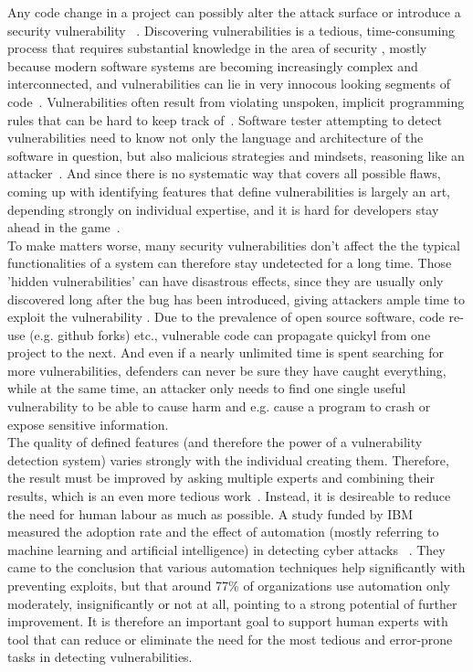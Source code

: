 \documentclass[
	a4paper,
	pagesize,
	pdftex,
	12pt,
	twoside, %
	BCOR=5mm, %
	ngerman,
	fleqn,
	final,
	]{scrartcl}
\begin{document}
Any code change in a project can possibly alter the attack surface or introduce a security vulnerability ~\cite{Morrison.2015}. Discovering vulnerabilities is a tedious, time-consuming process that requires substantial knowledge in the area of security \cite{Yamaguchi.2011}, mostly because modern software systems are becoming increasingly complex and interconnected, and vulnerabilities can lie in very innocous looking segments of code~\cite{Pang.2015, Li.2018}. Vulnerabilities often result from violating unspoken, implicit programming rules that can be hard to keep track of~\cite{Li.2005}. Software tester attempting to detect vulnerabilities need to know not only the language and architecture of the software in question, but also malicious strategies and mindsets, reasoning like an attacker~\cite{Pang.2015}. And since there is no systematic way that covers all possible flaws, coming up with identifying features that define vulnerabilities is largely an art, depending strongly on individual expertise, and it is hard for developers stay ahead in the game~\cite{Rolim.2018,Li.2018}.\\
To make matters worse, many security vulnerabilities don't affect the the typical functionalities of a system can therefore stay undetected for a long time. Those 'hidden vulnerabilities' can have disastrous effects, since they are usually only discovered long after the bug has been introduced, giving attackers ample time to exploit the vulnerability \cite{Wijayasekara.2012,Ma.2017,Russell.2018}. Due to the prevalence of open source software, code re-use (e.g. github forks) etc., vulnerable code can propagate quickyl from one project to the next. 
And even if a nearly unlimited time is spent searching for more vulnerabilities, defenders can never be sure they have caught everything, while at the same time, an attacker only needs to find one single useful vulnerability to be able to cause harm and e.g. cause a program to crash or expose sensitive information.\\

The quality of defined features (and therefore the power of a vulnerability detection system) varies strongly with the individual creating them. Therefore, the result must be improved by asking multiple experts and combining their results, which is an even more tedious work~\cite{Li.2018}. Instead, it is desireable to reduce the need for human labour as much as possible. A study funded by IBM measured the adoption rate and the effect of automation (mostly referring to machine learning and artificial intelligence) in detecting cyber attacks ~\cite{IBMNewsRoom.}. They came to the conclusion that various automation techniques help significantly with preventing exploits, but that around 77\% of organizations use automation only moderately, insignificantly or not at all, pointing to a strong potential of further improvement. It is therefore an important goal to support human experts with tool that can reduce or eliminate the need for the most tedious and error-prone tasks in detecting vulnerabilities.
\end{document}
